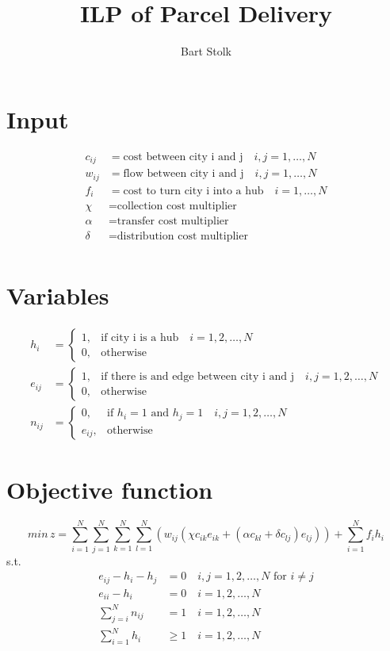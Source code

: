 \documentclass[11pt]{article} %
\title{ILP of Parcel Delivery}
\author{Bart Stolk}
\begin{document}
\maketitle

\section{Input}
\begin{align*}
c_{ij} &= \text{cost between city i and j}  \quad i,j=1,\ldots,N \\
w_{ij} &= \text{flow between city i and j} \quad i,j=1,\ldots,N \\
f_{i} &= \text{cost to turn city i into a hub} \quad i=1,\ldots,N \\
\chi &= \text{collection cost multiplier} \\
\alpha &= \text{transfer cost multiplier} \\
\delta &= \text{distribution cost multiplier} \\
\end{align*}

\section{Variables}
\begin{align*}
h_{i} &=
\begin{cases} 
1, & \text{if city i is a hub} \quad i=1,2,\ldots,N \\ 
0, & \text{otherwise} 
\end{cases} \\ 
e_{ij} &=
\begin{cases} 
1, & \text{if there is and edge between city i and j} \quad i,j=1,2,\ldots,N \\ 
0, & \text{otherwise} 
\end{cases} \\
n_{ij} &= 
\begin{cases} 
0, & \text{if } h_{i} = 1 \text{ and } h_{j}=1 \quad i,j=1,2,\ldots,N \\ 
e_{ij}, & \text{otherwise}
\end{cases}
\end{align*}

\section{Objective function}
$$min\,z=\sum^N_{i=1}\sum^N_{j=1}\sum^N_{k=1}\sum^N_{l=1}(w_{ij}(\chi c_{ik}e_{ik}+(\alpha c_{kl}+\delta c_{lj})e_{lj})) + \sum^N_{i=1}f_{i}h_{i}$$
s.t.
\begin{align*}
e_{ij}-h_{i}-h_{j} &= 0 \quad i,j=1,2,\ldots,N \text{ for } i \ne j \\
e_{ii}-h_{i} &= 0 \quad i=1,2,\ldots,N \\
\sum^N_{j=i}n_{ij} &= 1 \quad i=1,2,\ldots,N \\
\sum^N_{i=1}h_{i} &\geq 1 \quad i=1,2,\ldots,N
\end{align*}
\end{document}
